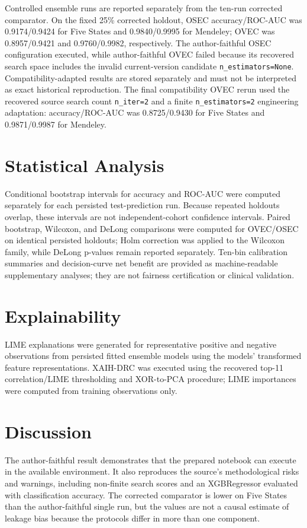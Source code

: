 \documentclass[11pt]{article}
\begin{document}
Controlled ensemble runs are reported separately from the ten-run corrected
comparator. On the fixed 25\% corrected holdout, OSEC accuracy/ROC-AUC was
0.9174/0.9424 for Five States and 0.9840/0.9995 for Mendeley; OVEC was
0.8957/0.9421 and 0.9760/0.9982, respectively. The author-faithful OSEC
configuration executed, while author-faithful OVEC failed because its
recovered search space includes the invalid current-version candidate
\texttt{n\_estimators=None}. Compatibility-adapted results are stored
separately and must not be interpreted as exact historical reproduction. The
final compatibility OVEC rerun used the recovered source search count
\texttt{n\_iter=2} and a finite \texttt{n\_estimators=2} engineering
adaptation: accuracy/ROC-AUC was 0.8725/0.9430 for Five States and
0.9871/0.9987 for Mendeley.

\section{Statistical Analysis}
Conditional bootstrap intervals for accuracy and ROC-AUC were computed separately for each persisted test-prediction run. Because repeated holdouts overlap, these intervals are not independent-cohort confidence intervals. Paired bootstrap, Wilcoxon, and DeLong comparisons were computed for OVEC/OSEC on identical persisted holdouts; Holm correction was applied to the Wilcoxon family, while DeLong p-values remain reported separately. Ten-bin calibration summaries and decision-curve net benefit are provided as machine-readable supplementary analyses; they are not fairness certification or clinical validation.

\section{Explainability}
LIME explanations were generated for representative positive and negative observations from persisted fitted ensemble models using the models' transformed feature representations. XAIH-DRC was executed using the recovered top-11 correlation/LIME thresholding and XOR-to-PCA procedure; LIME importances were computed from training observations only.

\section{Discussion}
The author-faithful result demonstrates that the prepared notebook can execute in the available environment. It also reproduces the source's methodological risks and warnings, including non-finite search scores and an XGBRegressor evaluated with classification accuracy. The corrected comparator is lower on Five States than the author-faithful single run, but the values are not a causal estimate of leakage bias because the protocols differ in more than one component.
\end{document}
